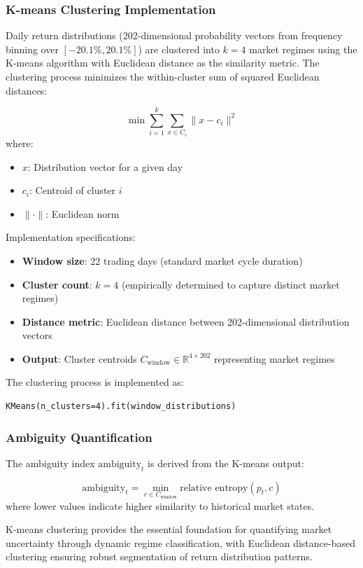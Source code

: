 \documentclass[preprint,12pt,authoryear]{elsarticle}
\begin{document}
\subsubsection*{K-means Clustering Implementation}
Daily return distributions (202-dimensional probability vectors from frequency binning over $[-20.1\%, 20.1\%]$) are clustered into $k=4$ market regimes using the K-means algorithm with Euclidean distance as the similarity metric. The clustering process minimizes the within-cluster sum of squared Euclidean distances:

\[
\min \sum_{i=1}^{k} \sum_{x \in C_i} \| x - c_i \|^2
\]
where:
\begin{itemize}
\item $x$: Distribution vector for a given day
\item $c_i$: Centroid of cluster $i$
\item $\| \cdot \|$: Euclidean norm
\end{itemize}

Implementation specifications:
\begin{itemize}
\item \textbf{Window size}: 22 trading days (standard market cycle duration)
\item \textbf{Cluster count}: $k=4$ (empirically determined to capture distinct market regimes)
\item \textbf{Distance metric}: Euclidean distance between 202-dimensional distribution vectors
\item \textbf{Output}: Cluster centroids $C_{\text{window}} \in \mathbb{R}^{4 \times 202}$ representing market regimes
\end{itemize}

The clustering process is implemented as:
\begin{verbatim}
KMeans(n_clusters=4).fit(window_distributions)
\end{verbatim}

\subsubsection*{Ambiguity Quantification}
The ambiguity index $\text{ambiguity}_t$ is derived from the K-means output:

\[
\text{ambiguity}_t = \min_{c \in C_{\text{window}}} \text{relative entropy}(p_t, c)
\]
where lower values indicate higher similarity to historical market states.

K-means clustering provides the essential foundation for quantifying market uncertainty through dynamic regime classification, with Euclidean distance-based clustering ensuring robust segmentation of return distribution patterns.
\end{document}
